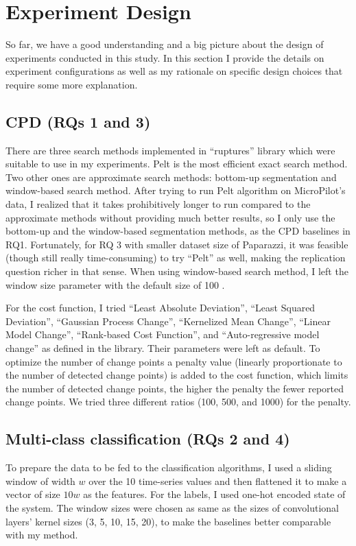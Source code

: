 \section{Experiment Design}
So far, we have a good understanding and a big picture about the design of experiments conducted in this study.
In this section I provide the details on experiment configurations as well as my rationale on specific design choices that require some more explanation.

\subsection{CPD (RQs 1 and 3)}
There are three search methods implemented in ``ruptures'' library which were suitable to use in my experiments. Pelt \cite{killick2012optimal} is the most efficient exact search method. Two other ones are approximate search methods: bottom-up segmentation and window-based search method. 
After trying to run Pelt algorithm on MicroPilot's data, I realized that it takes prohibitively longer to run compared to the approximate methods without providing much better results, so I only use the bottom-up and the window-based segmentation methods, as the CPD baselines in RQ1.
Fortunately, for RQ 3 with smaller dataset size of Paparazzi, it was feasible (though still really time-consuming) to try ``Pelt'' as well, making the replication question richer in that sense.
When using window-based search method, I left the window size parameter with the default size of 100 \cite{keogh2001online}.

For the cost function, I tried ``Least Absolute Deviation'', ``Least Squared Deviation'', ``Gaussian Process Change'', ``Kernelized Mean Change'', ``Linear Model Change'', ``Rank-based Cost Function'', and ``Auto-regressive model change'' as defined in the library. Their parameters were left as default.
To optimize the number of change points a penalty value (linearly proportionate to the number of detected change points) is added to the cost function, which limits the number of detected change points, the higher the penalty the fewer reported change points. We tried three different ratios (100, 500, and 1000) for the penalty.


\subsection{Multi-class classification (RQs 2 and 4)}
To prepare the data to be fed to the classification algorithms, I used a sliding window of width $w$ over the 10 time-series values and then flattened it to make a vector of size $10w$ as the features. For the labels, I used one-hot encoded state of the system.
The window sizes were chosen as same as the sizes of convolutional layers' kernel sizes (3, 5, 10, 15, 20), to make the baselines better comparable with my method. 

